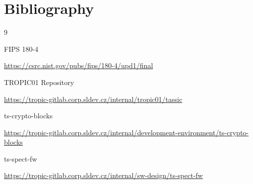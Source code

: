 \documentclass[notconfidential]{tropic_design_spec}
\begin{document}

\newpage

\section*{Bibliography}

\begin{thebibliography}{9}

{FIPS 180-4}

\url{https://csrc.nist.gov/pubs/fips/180-4/upd1/final}

{TROPIC01 Repository}

\url{https://tropic-gitlab.corp.sldev.cz/internal/tropic01/tassic}

{ts-crypto-blocks}

\url{https://tropic-gitlab.corp.sldev.cz/internal/development-environment/ts-crypto-blocks}

{ts-spect-fw}

\url{https://tropic-gitlab.corp.sldev.cz/internal/sw-design/ts-spect-fw}


\end{thebibliography}



\pagebreak
\tableofcontents


\end{document}
